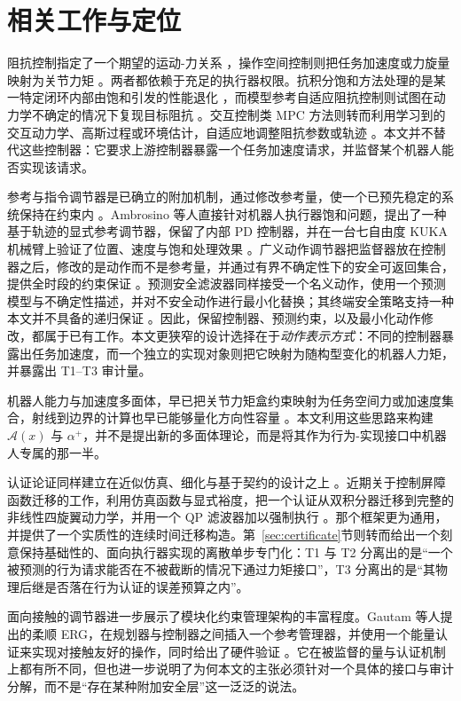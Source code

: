 \documentclass[journal]{IEEEtran}
\begin{document}
\section{相关工作与定位}
\label{sec:related}

阻抗控制指定了一个期望的运动-力关系 \cite{r1}，操作空间控制则把任务加速度或力旋量映射为关节力矩 \cite{r2}。两者都依赖于充足的执行器权限。抗积分饱和方法处理的是某一特定闭环内部由饱和引发的性能退化 \cite{r6,r7}，而模型参考自适应阻抗控制则试图在动力学不确定的情况下复现目标阻抗 \cite{r11}。交互控制类 MPC 方法则转而利用学习到的交互动力学、高斯过程或环境估计，自适应地调整阻抗参数或轨迹 \cite{r12,r13,r14,r15}。本文并不替代这些控制器：它要求上游控制器暴露一个任务加速度请求，并监督某个机器人能否实现该请求。

参考与指令调节器是已确立的附加机制，通过修改参考量，使一个已预先稳定的系统保持在约束内 \cite{r3}。Ambrosino 等人直接针对机器人执行器饱和问题，提出了一种基于轨迹的显式参考调节器，保留了内部 PD 控制器，并在一台七自由度 KUKA 机械臂上验证了位置、速度与饱和处理效果 \cite{r17}。广义动作调节器把监督器放在控制器之后，修改的是动作而不是参考量，并通过有界不确定性下的安全可返回集合，提供全时段的约束保证 \cite{r18}。预测安全滤波器同样接受一个名义动作，使用一个预测模型与不确定性描述，并对不安全动作进行最小化替换；其终端安全策略支持一种本文并不具备的递归保证 \cite{r5,r16}。因此，保留控制器、预测约束，以及最小化动作修改，都属于已有工作。本文更狭窄的设计选择在于\emph{动作表示方式}：不同的控制器暴露出任务加速度，而一个独立的实现对象则把它映射为随构型变化的机器人力矩，并暴露出 T1--T3 审计量。

机器人能力与加速度多面体，早已把关节力矩盒约束映射为任务空间力或加速度集合，射线到边界的计算也早已能够量化方向性容量 \cite{r20}。本文利用这些思路来构建 $\mathcal A(x)$ 与 $\alpha^+$，并不是提出新的多面体理论，而是将其作为行为-实现接口中机器人专属的那一半。

认证论证同样建立在近似仿真、细化与基于契约的设计之上 \cite{r8,r9,r10}。近期关于控制屏障函数迁移的工作，利用仿真函数与显式裕度，把一个认证从双积分器迁移到完整的非线性四旋翼动力学，并用一个 QP 滤波器加以强制执行 \cite{r19}。那个框架更为通用，并提供了一个实质性的连续时间迁移构造。第~\ref{sec:certificate}节则转而给出一个刻意保持基础性的、面向执行器实现的离散单步专门化：T1 与 T2 分离出的是“一个被预测的行为请求能否在不被截断的情况下通过力矩接口”，T3 分离出的是“其物理后继是否落在行为认证的误差预算之内”。

面向接触的调节器进一步展示了模块化约束管理架构的丰富程度。Gautam 等人提出的柔顺 ERG，在规划器与控制器之间插入一个参考管理器，并使用一个能量认证来实现对接触友好的操作，同时给出了硬件验证 \cite{r21}。它在被监督的量与认证机制上都有所不同，但也进一步说明了为何本文的主张必须针对一个具体的接口与审计分解，而不是“存在某种附加安全层”这一泛泛的说法。
\end{document}
